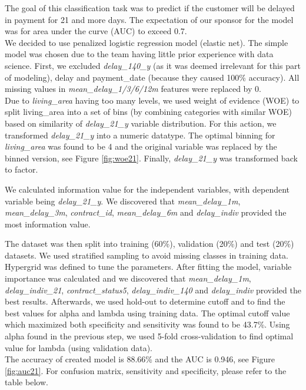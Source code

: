 \documentclass[
]{article}
\begin{document}
The goal of this classification task was to predict if the customer will be delayed in payment for 21 and more days. The expectation of our sponsor for the model was for area under the curve (AUC) to exceed 0.7.\\
We decided to use penalized logistic regression model (elastic net). The simple model was chosen due to the team having little prior experience with data science. First, we excluded \emph{delay\_140\_y} (as it was deemed irrelevant for this part of modeling), delay and payment\_date (because they caused 100\% accuracy). All missing values in \emph{mean\_delay\_1/3/6/12m} features were replaced by 0.\\
Due to \emph{living\_area} having too many levels, we used weight of evidence (WOE) to split living\_area into a set of bins (by combining categories with similar WOE) based on similarity of \emph{delay\_21\_y} variable distribution. For this action, we transformed \emph{delay\_21\_y} into a numeric datatype. The optimal binning for \emph{living\_area} was found to be 4 and the original variable was replaced by the binned version, see Figure \ref{fig:woe21}. Finally, \emph{delay\_21\_y} was transformed back to factor.

We calculated information value for the independent variables, with dependent variable being \emph{delay\_21\_y}. We discovered that \emph{mean\_delay\_1m}, \emph{mean\_delay\_3m}, \emph{contract\_id}, \emph{mean\_delay\_6m} and \emph{delay\_indiv} provided the most information value.

The dataset was then split into training (60\%), validation (20\%) and test (20\%) datasets. We used stratified sampling to avoid missing classes in training data.
Hypergrid was defined to tune the parameters. After fitting the model, variable importance was calculated and we discovered that \emph{mean\_delay\_1m}, \emph{delay\_indiv\_21}, \emph{contract\_status5}, \emph{delay\_indiv\_140} and \emph{delay\_indiv} provided the best results.
Afterwards, we used hold-out to determine cutoff and to find the best values for alpha and lambda using training data. The optimal cutoff value which maximized both specificity and sensitivity was found to be 43.7\%. Using alpha found in the previous step, we used 5-fold cross-validation to find optimal value for lambda (using validation data).\\
The accuracy of created model is 88.66\% and the AUC is 0.946, see Figure \ref{fig:auc21}. For confusion matrix, sensitivity and specificity, please refer to the table below.
\end{document}
